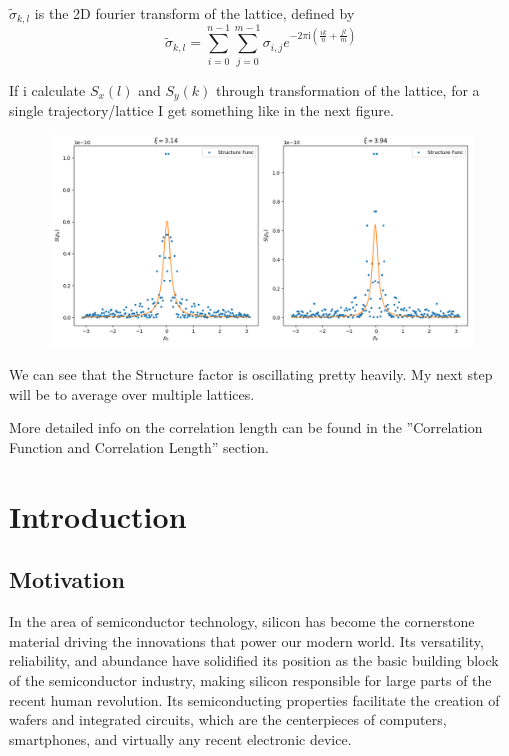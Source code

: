 	$\tilde{\sigma}_{k, l}$ is the 2D fourier transform of the lattice, defined by
	\begin{equation}
		\tilde{\sigma}_{k, l} =	\sum_{i = 0}^{n-1} \sum_{j =	0}^{m - 1} \sigma_{i,j}  e^{-2\pi \mathrm{i} \left(\frac{ik}{n} + \frac{jl}{m}\right)}
	\end{equation}
	
	If i calculate $S_x(l)$ and $S_y(k)$ through transformation of the lattice, for a single trajectory/lattice I get something like in the next figure.
	\begin{figure}
		\centering
		\includegraphics[width=13.5cm]{graphics/structfunc.png}
	\end{figure}
	We can see that the Structure factor is oscillating pretty heavily. My next step will be to average over multiple lattices.
	
	More detailed info on the correlation length can be found in the ''Correlation Function and Correlation Length'' section.
	
	\mainmatter
	\renewcommand{\chapterautorefname}{Chapter}
	\renewcommand{\sectionautorefname}{Section}
	\chapter{Introduction}
	\section{Motivation}
	In the area of semiconductor technology, silicon has become the cornerstone material driving the innovations that power our modern world. Its versatility, reliability, and abundance have solidified its position as the basic building block of the semiconductor industry, making silicon responsible for large parts of the recent human revolution. Its semiconducting properties facilitate the creation of wafers and integrated circuits, which are the centerpieces of computers, smartphones, and virtually any recent electronic device. \\
	
